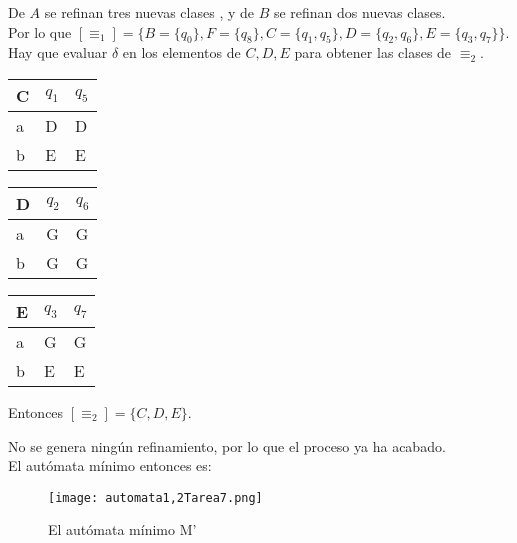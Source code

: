 \documentclass{article}
\begin{document}
\begin{enumerate}
{\begin{enumerate}
{                    De $A$ se refinan tres nuevas clases , y de $B$ se refinan 
                    dos nuevas clases.\\
                    Por lo que $[\equiv_{1}] = \{B=\{q_{0}\}, F=\{q_{8}\} , 
                    C = \{q_{1}, q_{5}\},
    				D = \{q_{2}, q_{6}\}, E = \{q_{3}, q_{7}\}\}$.\\
    				Hay que evaluar $\delta$ en 
                    los elementos de $C, D, E$ para obtener las clases de 
                    $\equiv_{2}$.\\
    				\begin{table}[H]
    					\centering
    					\begin{tabular}{|l|l|l|}
    						\hline
    						C & $q_{1}$ & $q_{5}$ \\ \hline
    						a & D       & D       \\ \hline
    						b & E       & E       \\ \hline
    					\end{tabular}
    				    \quad
    				    \begin{tabular}{|l|l|l|}
    				    	\hline
    				    	D & $q_{2}$ & $q_{6}$ \\ \hline
    				    	a & G       & G       \\ \hline
    				    	b & G       & G       \\ \hline
    				    \end{tabular}
    			    	\quad
    			    	\begin{tabular}{|l|l|l|}
    			    		\hline
    			    		E & $q_{3}$ & $q_{7}$ \\ \hline
    			    		a & G       & G     \\ \hline
    			    		b & E       & E       \\ \hline
    			    	\end{tabular}
    				\end{table} 
    				Entonces $[\equiv_{2}] = \{C, D, E \}$.
    				
    				No se genera ningún refinamiento, por lo que el 
    				proceso ya ha acabado.\\
    				El autómata mínimo entonces es:
    					\begin{figure} [H]
    					\centering
    					\texttt{[image: automata1,2Tarea7.png]}
    					\caption{El autómata mínimo M'}
    				\end{figure}
    			}
    		

\end{enumerate}}
\end{enumerate}
\end{document}
